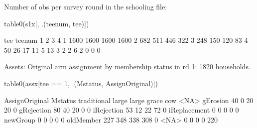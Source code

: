 Number of obs per survey round in the schooling file:
\begin{Schunk}
\begin{Sinput}
table0(s1x[, .(teenum, tee)])
\end{Sinput}
\begin{Soutput}
      tee
teenum    1    2    3    4
     1 1600 1600 1600 1600
     2  682  511  446  322
     3  248  150  120   83
     4   50   26   17   11
     5   13    3    2    2
     6    2    0    0    0
\end{Soutput}
\end{Schunk}
Assets: Original arm assignment by membership status in rd 1: 1820 households.
\begin{Schunk}
\begin{Sinput}
table0(assx[tee == 1, .(Mstatus, AssignOriginal)])
\end{Sinput}
\begin{Soutput}
              AssignOriginal
Mstatus        traditional large large grace cow <NA>
  gErosion              40     0          20  20    0
  gRejection            80    40          20   0    0
  iRejection            53    12          22  72    0
  iReplacement           0     0           0   0    0
  newGroup               0     0           0   0    0
  oldMember            227   348         338 308    0
  <NA>                   0     0           0   0  220
\end{Soutput}
\end{Schunk}
